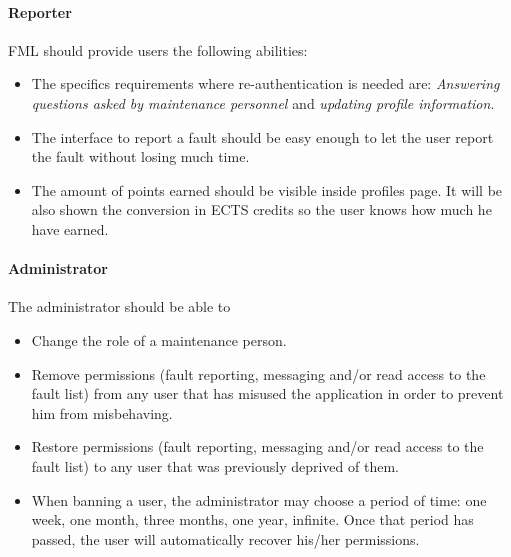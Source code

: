 \paragraph{Reporter} FML should provide users the following abilities:
\begin{itemize}
\item The specifics requirements where re-authentication is needed are: \textit{Answering questions asked by maintenance personnel}   \label{Specifics_Secure_Requirements_for_user} and \textit{updating profile information}.
\item The interface to report a fault should be easy enough to let the user report the fault without losing much time.
\item The amount of points earned should be visible inside profiles page. It will be also shown the conversion in ECTS credits so the user knows how much he have earned.

\end{itemize}

\paragraph{Administrator} The administrator should be able to

\begin{itemize}
\item Change the role of a maintenance person.
\item Remove permissions (fault reporting, messaging and/or read access to the fault list) from any user that has misused the application in order to prevent him from misbehaving.
\item Restore permissions (fault reporting, messaging and/or read access to the fault list) to any user that was previously deprived of them.
\item When banning a user, the administrator may choose a period of time: one week, one month, three months, one year, infinite. Once that period has passed, the user will automatically recover his/her permissions.
\end{itemize}
